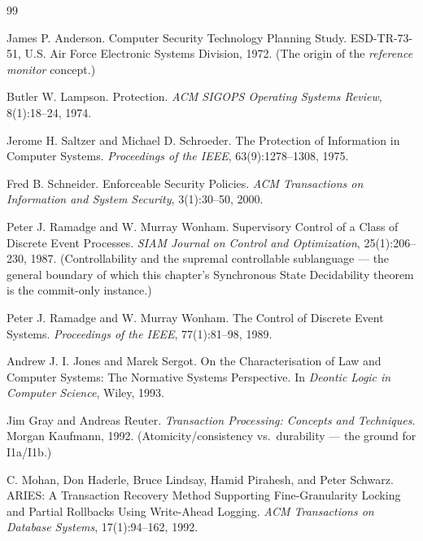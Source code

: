 \documentclass[11pt,a4paper]{article}
\theoremstyle{definition}
\theoremstyle{remark}
\begin{document}

\begin{thebibliography}{99}

James P. Anderson.
\newblock Computer Security Technology Planning Study.
\newblock ESD-TR-73-51, U.S. Air Force Electronic Systems Division, 1972.
\newblock (The origin of the \emph{reference monitor} concept.)

Butler W. Lampson.
\newblock Protection.
\newblock \textit{ACM SIGOPS Operating Systems Review}, 8(1):18--24, 1974.

Jerome H. Saltzer and Michael D. Schroeder.
\newblock The Protection of Information in Computer Systems.
\newblock \textit{Proceedings of the IEEE}, 63(9):1278--1308, 1975.

Fred B. Schneider.
\newblock Enforceable Security Policies.
\newblock \textit{ACM Transactions on Information and System Security}, 3(1):30--50, 2000.

Peter J. Ramadge and W. Murray Wonham.
\newblock Supervisory Control of a Class of Discrete Event Processes.
\newblock \textit{SIAM Journal on Control and Optimization}, 25(1):206--230, 1987.
\newblock (Controllability and the supremal controllable sublanguage --- the general
boundary of which this chapter's Synchronous State Decidability theorem is the
commit-only instance.)

Peter J. Ramadge and W. Murray Wonham.
\newblock The Control of Discrete Event Systems.
\newblock \textit{Proceedings of the IEEE}, 77(1):81--98, 1989.

Andrew J. I. Jones and Marek Sergot.
\newblock On the Characterisation of Law and Computer Systems: The Normative Systems Perspective.
\newblock In \textit{Deontic Logic in Computer Science}, Wiley, 1993.

Jim Gray and Andreas Reuter.
\newblock \textit{Transaction Processing: Concepts and Techniques}.
\newblock Morgan Kaufmann, 1992.
\newblock (Atomicity/consistency vs.\ durability --- the ground for I1a/I1b.)

C. Mohan, Don Haderle, Bruce Lindsay, Hamid Pirahesh, and Peter Schwarz.
\newblock ARIES: A Transaction Recovery Method Supporting Fine-Granularity Locking and Partial Rollbacks Using Write-Ahead Logging.
\newblock \textit{ACM Transactions on Database Systems}, 17(1):94--162, 1992.


\end{thebibliography}
\end{document}
